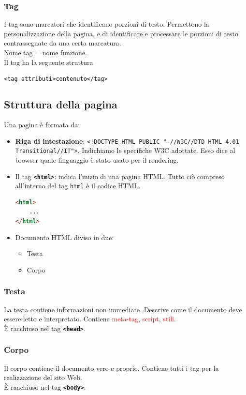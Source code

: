 \documentclass{article}
\begin{document}
\subsubsection{Tag}
I tag sono marcatori che identificano porzioni di testo. Permettono la personalizzazione della pagina, e di identificare e processare le porzioni di testo contrassegnate da una certa marcatura.
\\ Nome tag = nome funzione.
\\ Il tag ha la seguente struttura
\begin{center}
    \texttt{<tag attributi>contenuto</tag>}
\end{center}
\subsection{Struttura della pagina}
Una pagina è formata da:
\begin{itemize}
    \item \textbf{Riga di intestazione}: \texttt{<!DOCTYPE HTML PUBLIC "-//W3C//DTD HTML 4.01
              Transitional//IT">}. Indichiamo le specifiche W3C adottate. Esso dice al browser quale linguaggio è stato usato per il rendering.
    \item Il tag \textbf{\texttt{<html>}}: indica l'inizio di una pagina HTML. Tutto ciò compreso all'interno del tag \texttt{html} è il codice HTML.
          \begin{lstlisting}[language=HTML]
<html>
    ...
</html>
\end{lstlisting}
    \item Documento HTML diviso in due:
          \begin{itemize}
              \item Testa
              \item Corpo
          \end{itemize}
\end{itemize}

\subsubsection{Testa}
La testa contiene informazioni non immediate. Descrive come il documento deve essere letto e interpretato. Contiene \textcolor{red}{meta-tag}, \textcolor{red}{script}, \textcolor{red}{stili}.
\\ È racchiuso nel tag \texttt{\textbf{<head>}}.
\subsubsection{Corpo}
Il corpo contiene il documento vero e proprio. Contiene tutti i tag per la realizzazione del sito Web.
\\ È raachiuso nel tag \texttt{\textbf{<body>}}.
\end{document}
